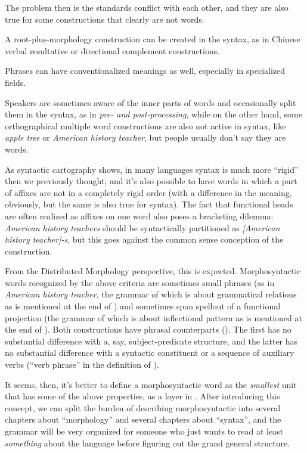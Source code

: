 \documentclass[UTF8, a4paper, oneside, scheme=plain]{ctexrep}
\newcommand{\corpus}[1]{\emph{#1}}
\begin{document}
The problem then is the standards conflict with each other,
and they are also true for some constructions that clearly are not words.
\begin{enumerate*}
    \item A root-plus-morphology construction 
    can be created in the syntax,
    as in Chinese verbal resultative or directional complement constructions.
    \item Phrases can have conventionalized meanings as well,
    especially in specialized fields.
    \item Speakers are sometimes aware of the inner parts of words 
    and occasionally split them in the syntax,
    as in \corpus{pre- and post-processing},
    while on the other hand,
    some orthographical multiple word constructions 
    are also not active in syntax,
    like \corpus{apple tree} or \corpus{American history teacher},
    but people usually don't say they are words.
    \item As syntactic cartography shows,
    in many languages syntax is much more ``rigid'' then we previously thought,
    and it's also possible to have words in which a part of affixes are not in a completely rigid order
    (with a difference in the meaning, obviously, but the same is also true for syntax).
    The fact that functional heads are often realized as affixes on one word
    also poses a bracketing dilemma:
    \corpus{American history teachers} should be syntactically partitioned as 
    \corpus{[American history teacher]-s},
    but this goes against the common sense conception of the construction.
\end{enumerate*}

From the Distributed Morphology perspective,
this is expected.
Morphosyntactic words recognized by the above criteria 
are sometimes small phrases
(as in \corpus{American history teacher}, 
the grammar of which is about grammatical relations 
as is mentioned at the end of ) 
and sometimes span spellout of a functional projection
(the grammar of which is about inflectional pattern 
as is mentioned at the end of ).
Both constructions have phrasal counterparts ().
The first has no substantial difference with a, say, subject-predicate structure,
and the latter has no substantial difference with a syntactic constituent or 
a sequence of auxiliary verbs
(``verb phrase'' in the definition of \citet{dixon2009basic1}).

It seems, then, 
it's better to define a morphosyntactic word as the \emph{smallest} unit 
that has some of the above properties,
as a layer in .
After introducing this concept,
we can split the burden of describing morphosyntactic 
into several chapters about ``morphology''
and several chapters about ``syntax'',
and the grammar will be very organized 
for someone who just wants to read at least \emph{something} about the language 
before figuring out the grand general structure.
\end{document}
